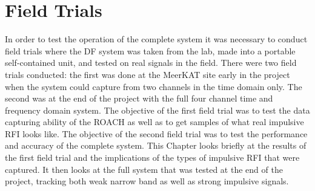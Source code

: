 \chapter{Field Trials}
\label{ch:field-trials}
\graphicspath{{./img/field-trials/}}

In order to test the operation of the complete system it was necessary to conduct field trials where the DF system was taken from the lab, made into a portable self-contained unit, and tested on real signals in the field. There were two field trials conducted: the first was done at the MeerKAT site early in the project when the system could capture from two channels in the time domain only. The second was at the end of the project with the full four channel time and frequency domain system. The objective of the first field trial was to test the data capturing ability of the ROACH as well as to get samples of what real impulsive RFI looks like. The objective of the second field trial was to test the performance and accuracy of the complete system.
This Chapter looks briefly at the results of the first field trial and the implications of the types of impulsive RFI that were captured. It then looks at the full system that was tested at the end of the project, tracking both weak narrow band as well as strong impulsive signals. 




